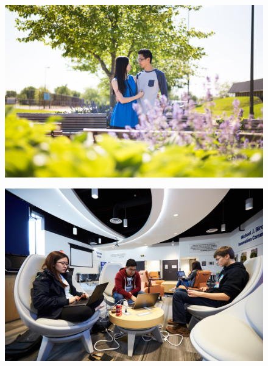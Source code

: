\documentclass{report}
\begin{document}
\begin{landscape}
  \begin{figure}
    \centering
    \includegraphics[height=\textheight]{res/port_jessica_roy.jpg}
  \end{figure}
\end{landscape}

\begin{landscape}
  \begin{figure}
    \centering
    \includegraphics[height=\textheight]{res/promo_in2.jpg}
  \end{figure}
\end{landscape}
\end{document}
